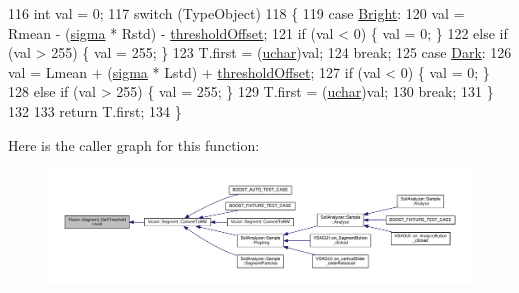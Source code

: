 \begin{DoxyCode}
116         \textcolor{keywordtype}{int} val = 0;
117         \textcolor{keywordflow}{switch} (TypeObject)
118         \{
119         \textcolor{keywordflow}{case} \hyperlink{class_vision_1_1_segment_ac3ddf2c72ee6333007510b680db1e7ddad37a09a08a5a4fdf88cb15f21e5ff28b}{Bright}:
120             val = Rmean - (\hyperlink{class_vision_1_1_segment_a0d2c607a6064d8d8fea925fc7bfbbc53}{sigma} * Rstd) - \hyperlink{class_vision_1_1_segment_a1338fc42ead26c6b1dd661f4281f5674}{thresholdOffset};
121             \textcolor{keywordflow}{if} (val < 0) \{ val = 0; \}
122             \textcolor{keywordflow}{else} \textcolor{keywordflow}{if} (val > 255) \{ val = 255; \}
123             T.first = (\hyperlink{_soil_math_types_8h_a65f85814a8290f9797005d3b28e7e5fc}{uchar})val;
124             \textcolor{keywordflow}{break};
125         \textcolor{keywordflow}{case} \hyperlink{class_vision_1_1_segment_ac3ddf2c72ee6333007510b680db1e7dda962a0c0955809f63df036dbd41824c54}{Dark}:
126             val = Lmean + (\hyperlink{class_vision_1_1_segment_a0d2c607a6064d8d8fea925fc7bfbbc53}{sigma} * Lstd) + \hyperlink{class_vision_1_1_segment_a1338fc42ead26c6b1dd661f4281f5674}{thresholdOffset};
127             \textcolor{keywordflow}{if} (val < 0) \{ val = 0; \}
128             \textcolor{keywordflow}{else} \textcolor{keywordflow}{if} (val > 255) \{ val = 255; \}
129             T.first = (\hyperlink{_soil_math_types_8h_a65f85814a8290f9797005d3b28e7e5fc}{uchar})val;
130             \textcolor{keywordflow}{break};
131         \}
132 
133         \textcolor{keywordflow}{return} T.first;
134     \}
\end{DoxyCode}


Here is the caller graph for this function\+:\nopagebreak
\begin{figure}[H]
\begin{center}
\leavevmode
\includegraphics[width=350pt]{class_vision_1_1_segment_a1b15d616db9cbdcd0b07bb267f60895b_icgraph}
\end{center}
\end{figure}


\hypertarget{class_vision_1_1_segment_ac10de08f4c3b0f8cb91f0469b6cf37c9}{}
